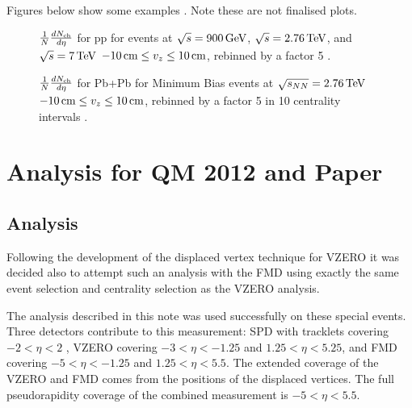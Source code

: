 \documentclass[11pt]{article}
\begin{document}
Figures below show some examples \cite{hhd:2009}.  Note these are not
finalised plots.
\begin{figure}[]
  \centering
  \caption{$\dndeta$ for pp for \INEL{} events at
    $\sqrt{s}=\GeV{900}$, $\sqrt{s}=\TeV{2.76}$, and $\sqrt{s}=\TeV{7}$
    $\cm{-10}\le v_z\le\cm{10}$, rebinned by a factor 5 \cite{hhd:2009}. 
  }
  \label{fig:1}
\end{figure} 
\begin{figure}[]
  \centering
  \caption{$\dndeta$ for Pb+Pb for Minimum Bias events at
    $\sqrt{s_{NN}}=\TeV{2.76}$ $\cm{-10}\le v_z\le\cm{10}$, rebinned by a
    factor 5 in 10 centrality intervals \cite{hhd:2009}. 
}
  \label{fig:2}
\end{figure} 


\clearpage

\section{Analysis for QM 2012 and Paper} \label{prelim}
\subsection{Analysis}

Following the development of the displaced vertex technique for VZERO
\cite{maxime} it was decided also to attempt such an analysis with the
FMD using exactly the same event selection and centrality selection as
the VZERO analysis.

The analysis described in this note was used successfully on these
special events. Three detectors contribute to this measurement: SPD
with tracklets covering $-2<\eta<2$ \cite{ruben,Aamodt:2010cz}, VZERO
covering $-3<\eta<-1.25$ and $1.25<\eta<5.25$, and FMD covering
$-5<\eta<-1.25$ and $1.25<\eta<5.5$. The extended coverage of the
VZERO and FMD comes from the positions of the displaced vertices. The
full pseudorapidity coverage of the combined measurement is
$-5<\eta<5.5$.
\end{document}
